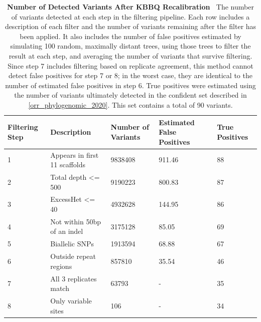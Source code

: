 \documentclass{report}
\newcommand{\titlecaption}[2]{\caption[#1]{\textbf{#1 \textbar\,} #2}}
\begin{document}
\begin{table}
\begin{tabularx}{\textwidth}{l  l  l  l  l}
\toprule
\textbf{Filtering Step} & \textbf{Description} & \textbf{Number of Variants} & \textbf{Estimated False Positives} & \textbf{True Positives}\\
\midrule
1 & Appears in first 11 scaffolds & 9838408 & 911.46 & 88\\
2 & Total depth <= 500 & 9190223 & 800.83 & 87\\
3 & ExcessHet <= 40 & 4932628 & 144.95 & 86\\
4 & Not within 50bp of an indel & 3175128 & 85.05 & 69\\
5 & Biallelic SNPs & 1913594 & 68.88 & 67\\
6 & Outside repeat regions & 857810 & 35.54 & 46\\
7 & All 3 replicates match & 63793 & - & 35\\
8 & Only variable sites & 106 & - & 34\\
\bottomrule
\end{tabularx}
\titlecaption{Number of Detected Variants After KBBQ Recalibration}{The number of variants detected at each step in the filtering pipeline. Each row includes a description of each filter and the number of variants remaining after the filter has been applied. It also includes the number of false positives estimated by simulating 100 random, maximally distant trees, using those trees to filter the result at each step, and averaging the number of variants that survive filtering. Since step 7 includes filtering based on replicate agreement, this method cannot detect false positives for step 7 or 8; in the worst case, they are identical to the number of estimated false positives in step 6. True positives were estimated using the number of variants ultimately detected in the confident set described in \ref{orr_phylogenomic_2020}. This set contains a total of 90 variants.}
\label{tbl:num_variants}
\end{table}
\end{document}
